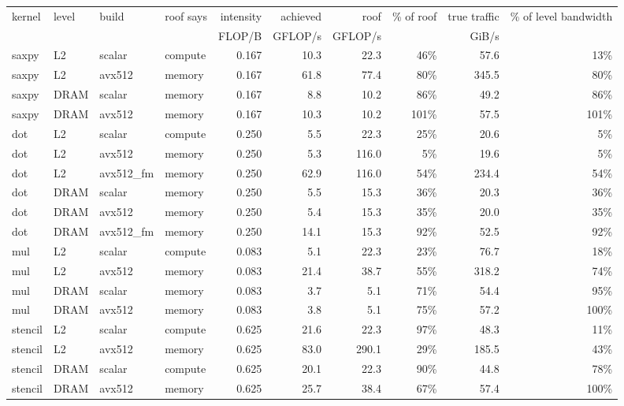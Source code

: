 \begin{tabular}{llllrrrrrr}
\toprule
kernel & level & build & roof says & intensity & achieved & roof & \% of roof & true traffic & \% of level bandwidth \\
 & & & & FLOP/B & GFLOP/s & GFLOP/s & & GiB/s & \\
\midrule
saxpy & L2 & scalar & compute & 0.167 & 10.3 & 22.3 & 46\% & 57.6 & 13\% \\
saxpy & L2 & avx512 & memory & 0.167 & 61.8 & 77.4 & 80\% & 345.5 & 80\% \\
saxpy & DRAM & scalar & memory & 0.167 & 8.8 & 10.2 & 86\% & 49.2 & 86\% \\
saxpy & DRAM & avx512 & memory & 0.167 & 10.3 & 10.2 & 101\% & 57.5 & 101\% \\
\addlinespace
dot & L2 & scalar & compute & 0.250 & 5.5 & 22.3 & 25\% & 20.6 & 5\% \\
dot & L2 & avx512 & memory & 0.250 & 5.3 & 116.0 & 5\% & 19.6 & 5\% \\
dot & L2 & avx512\_fm & memory & 0.250 & 62.9 & 116.0 & 54\% & 234.4 & 54\% \\
dot & DRAM & scalar & memory & 0.250 & 5.5 & 15.3 & 36\% & 20.3 & 36\% \\
dot & DRAM & avx512 & memory & 0.250 & 5.4 & 15.3 & 35\% & 20.0 & 35\% \\
dot & DRAM & avx512\_fm & memory & 0.250 & 14.1 & 15.3 & 92\% & 52.5 & 92\% \\
\addlinespace
mul & L2 & scalar & compute & 0.083 & 5.1 & 22.3 & 23\% & 76.7 & 18\% \\
mul & L2 & avx512 & memory & 0.083 & 21.4 & 38.7 & 55\% & 318.2 & 74\% \\
mul & DRAM & scalar & memory & 0.083 & 3.7 & 5.1 & 71\% & 54.4 & 95\% \\
mul & DRAM & avx512 & memory & 0.083 & 3.8 & 5.1 & 75\% & 57.2 & 100\% \\
\addlinespace
stencil & L2 & scalar & compute & 0.625 & 21.6 & 22.3 & 97\% & 48.3 & 11\% \\
stencil & L2 & avx512 & memory & 0.625 & 83.0 & 290.1 & 29\% & 185.5 & 43\% \\
stencil & DRAM & scalar & compute & 0.625 & 20.1 & 22.3 & 90\% & 44.8 & 78\% \\
stencil & DRAM & avx512 & memory & 0.625 & 25.7 & 38.4 & 67\% & 57.4 & 100\% \\
\bottomrule
\end{tabular}
